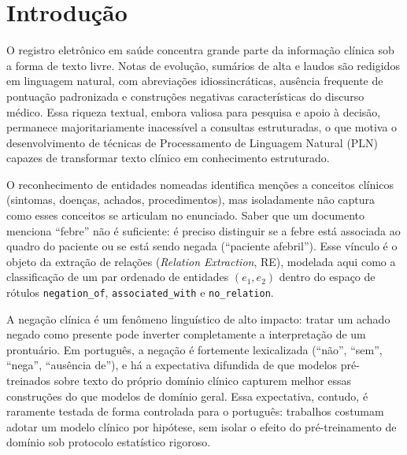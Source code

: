 \documentclass[12pt]{article}
\begin{document}
\section{Introdução}

O registro eletrônico em saúde concentra grande parte da informação clínica sob
a forma de texto livre. Notas de evolução, sumários de alta e laudos são
redigidos em linguagem natural, com abreviações idiossincráticas, ausência
frequente de pontuação padronizada e construções negativas características do
discurso médico. Essa riqueza textual, embora valiosa para pesquisa e apoio à
decisão, permanece majoritariamente inacessível a consultas estruturadas, o que
motiva o desenvolvimento de técnicas de Processamento de Linguagem Natural (PLN)
capazes de transformar texto clínico em conhecimento estruturado.

O reconhecimento de entidades nomeadas identifica menções a conceitos clínicos
(sintomas, doenças, achados, procedimentos), mas isoladamente não captura como
esses conceitos se articulam no enunciado. Saber que um documento menciona
``febre'' não é suficiente: é preciso distinguir se a febre está associada ao
quadro do paciente ou se está sendo negada (``paciente afebril''). Esse vínculo
é o objeto da extração de relações (\emph{Relation Extraction}, RE), modelada
aqui como a classificação de um par ordenado de entidades $(e_1, e_2)$ dentro do
espaço de rótulos \texttt{negation\_of}, \texttt{associated\_with} e
\texttt{no\_relation}.

A negação clínica é um fenômeno linguístico de alto impacto: tratar um achado
negado como presente pode inverter completamente a interpretação de um
prontuário. Em português, a negação é fortemente lexicalizada (``não'', ``sem'',
``nega'', ``ausência de''), e há a expectativa difundida de que modelos
pré-treinados sobre texto do próprio domínio clínico capturem melhor essas
construções do que modelos de domínio geral. Essa expectativa, contudo, é
raramente testada de forma controlada para o português: trabalhos costumam adotar
um modelo clínico por hipótese, sem isolar o efeito do pré-treinamento de
domínio sob protocolo estatístico rigoroso.
\end{document}
